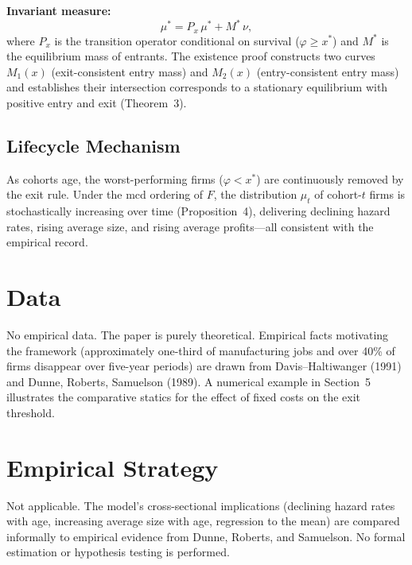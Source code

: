 \textbf{Invariant measure:}
\begin{equation}
  \mu^* = P_x\,\mu^* + M^*\,\nu,
  \label{eq:hop_invariant}
\end{equation}
where $P_x$ is the transition operator conditional on survival ($\varphi \geq
x^*$) and $M^*$ is the equilibrium mass of entrants. The existence proof
constructs two curves $M_1(x)$ (exit-consistent entry mass) and $M_2(x)$
(entry-consistent entry mass) and establishes their intersection corresponds
to a stationary equilibrium with positive entry and exit (Theorem~3).

\subsection*{Lifecycle Mechanism}

As cohorts age, the worst-performing firms ($\varphi < x^*$) are continuously
removed by the exit rule. Under the mcd ordering of $F$, the distribution
$\mu_t$ of cohort-$t$ firms is stochastically increasing over time (Proposition~4),
delivering declining hazard rates, rising average size, and rising average
profits---all consistent with the empirical record.

\section{Data}

No empirical data. The paper is purely theoretical. Empirical facts motivating
the framework (approximately one-third of manufacturing jobs and over 40\% of
firms disappear over five-year periods) are drawn from Davis--Haltiwanger
(1991) and Dunne, Roberts, Samuelson (1989). A numerical example in Section~5
illustrates the comparative statics for the effect of fixed costs on the exit
threshold.

\section{Empirical Strategy}

Not applicable. The model's cross-sectional implications (declining hazard
rates with age, increasing average size with age, regression to the mean) are
compared informally to empirical evidence from Dunne, Roberts, and Samuelson.
No formal estimation or hypothesis testing is performed.

